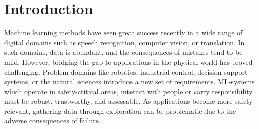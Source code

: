 \chapter{Introduction}
\label{toc:bayesian_ml}





Machine learning methods have seen great success recently in a wide range of digital domains such as speech recognition, computer vision, or translation.
In such domains, data is abundant, and the consequences of mistakes tend to be mild.
However, bridging the gap to applications in the physical world has proved challenging.
Problem domains like robotics, industrial control, decision support systems, or the natural sciences introduce a new set of requirements.
ML-systems which operate in safety-critical areas, interact with people or carry responsibility must be robust, trustworthy, and assessable.
As applications become more safety-relevant, gathering data through exploration can be problematic due to the adverse consequences of failure.


